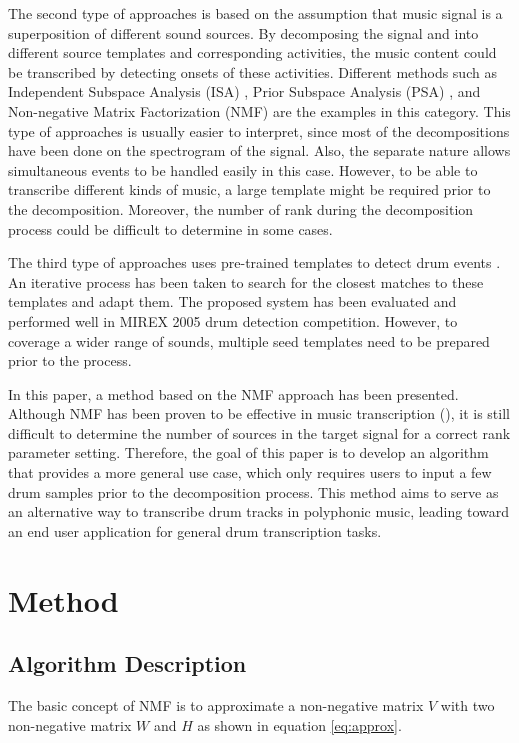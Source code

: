 \documentclass{article}
\begin{document}
The second type of approaches is based on the assumption that music signal is a superposition of different sound sources. By decomposing the signal and into different source templates and corresponding activities, the music content could be transcribed by detecting onsets of these activities. Different methods such as Independent Subspace Analysis (ISA) \cite{16}, Prior Subspace Analysis (PSA) \cite{8}, and Non-negative Matrix Factorization (NMF) \cite{14,17,18} are the examples in this category. This type of approaches is usually easier to interpret, since most of the decompositions have been done on the spectrogram of the signal. Also, the separate nature allows simultaneous events to be handled easily in this case. However, to be able to transcribe different kinds of music, a large template might be required prior to the decomposition. Moreover, the number of rank during the decomposition process could be difficult to determine in some cases. 

The third type of approaches uses pre-trained templates to detect drum events \cite{19,20}. An iterative process has been taken to search for the closest matches to these templates and adapt them. The proposed system has been evaluated and performed well in MIREX 2005 drum detection competition. However, to coverage a wider range of sounds, multiple seed templates need to be prepared prior to the process.

In this paper, a method based on the NMF approach has been presented. Although NMF has been proven to be effective in music transcription (\cite{2003 Smaragdis, NMF}), it is still difficult to determine the number of sources in the target signal for a correct rank parameter setting. Therefore, the goal of this paper is to develop an algorithm that provides a more general use case, which only requires users to input a few drum samples prior to the decomposition process. This method aims to serve as an alternative way to transcribe drum tracks in polyphonic music, leading toward an end user application for general drum transcription tasks.  
 
\section{Method}\label{sec:method}
\subsection{Algorithm Description}\label{subsec:algorithm description}
The basic concept of NMF is to approximate a non-negative matrix $V$ with two non-negative matrix $W$ and $H$ as shown in equation \eqref{eq:approx}.
\end{document}
